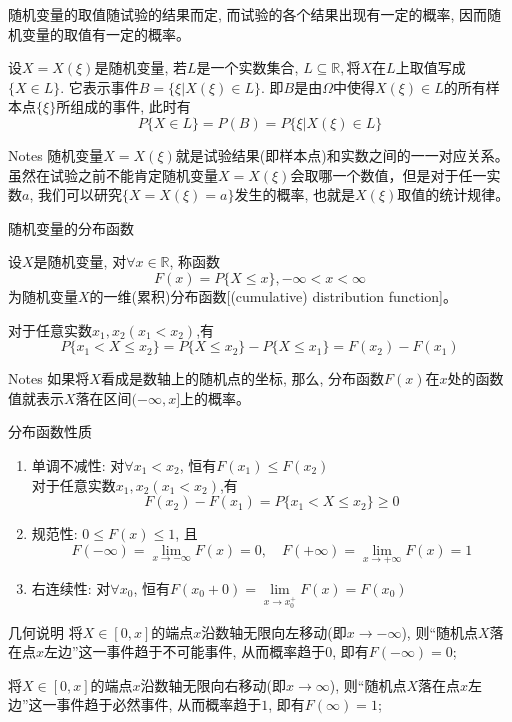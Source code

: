 \begin{frame}
随机变量的取值随试验的结果而定, 而试验的各个结果出现有一定的概率, 因而随机变量的取值有一定的概率。
\begin{definition}
	设$X=X(\xi)$是随机变量, 若$L$是一个实数集合, $L\subseteq\mathbb{R}, $将$X$在$L$上取值写成$\{X\in L\}$. 它表示事件$B=\{\xi|X(\xi)\in L \}$. 即$B$是由$\Omega$中使得$X(\xi)\in L$的所有样本点$\{\xi\}$所组成的事件, 此时有
    \[P\{X\in L\}=P(B)=P\{\xi|X(\xi)\in L\} \]
\end{definition}
\begin{block}{Notes}
	随机变量$X=X(\xi)$就是试验结果(即样本点)和实数之间的一一对应关系。虽然在试验之前不能肯定随机变量$X=X(\xi)$会取哪一个数值，但是对于任一实数$a$, 我们可以研究$\{X=X(\xi)=a \}$发生的概率, 也就是$X(\xi)$取值的统计规律。
\end{block}
\end{frame}

\begin{frame}{随机变量的分布函数}
\begin{definition}
	设$X$是随机变量, 对$\forall x\in\mathbb{R}$, 称函数
	\[F(x)=P\{X\le x\}, -\infty<x<\infty\]
	为随机变量$X$的一维(累积)分布函数[(cumulative) distribution function]。
\end{definition}
对于任意实数$x_1,x_2(x_1<x_2)$,有
\[P\{x_1<X\le x_2\}=P\{X\le x_2\}-P\{X\le x_1\}=F(x_2)-F(x_1) \]
\begin{block}{Notes}
	如果将$X$看成是数轴上的随机点的坐标, 那么, 分布函数$F(x)$在$x$处的函数值就表示$X$落在区间$(-\infty,x]$上的概率。
\end{block}
\end{frame}

\begin{frame}
\begin{block}{分布函数性质}
	\begin{enumerate}
		\item 单调不减性: 对$\forall x_1<x_2$, 恒有$F(x_1)\le F(x_2)$\\
		对于任意实数$x_1,x_2(x_1<x_2)$,有
		\[F(x_2)-F(x_1)=P\{x_1<X\le x_2\}\ge 0 \]
		\item 规范性: $0\le F(x)\le 1$, 且
		\[ F(-\infty)=\lim\limits_{x\to -\infty}F(x)=0,\quad F(+\infty)=\lim\limits_{x\to +\infty}F(x)=1 \]
		\item 右连续性: 对$\forall x_0$, 恒有$F(x_0+0)=\lim\limits_{x\to x_0^+}F(x)=F(x_0)$
	\end{enumerate}
\end{block}
\begin{block}{几何说明}
	将$X\in [0,x]$的端点$x$沿数轴无限向左移动(即$x\to -\infty$), 则``随机点$X$落在点$x$左边''这一事件趋于不可能事件, 从而概率趋于$0$, 即有$F(-\infty)=0$;
	
	\medskip
	将$X\in [0,x]$的端点$x$沿数轴无限向右移动(即$x\to \infty$), 则``随机点$X$落在点$x$左边''这一事件趋于必然事件, 从而概率趋于$1$, 即有$F(\infty)=1$;
\end{block}

\end{frame}

